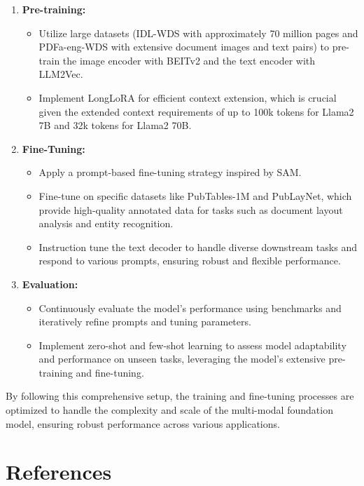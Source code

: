 \documentclass{article}
\begin{document}
\begin{enumerate}
    \item \textbf{Pre-training:}
    \begin{itemize}
        \item Utilize large datasets (IDL-WDS with approximately 70 million pages and PDFa-eng-WDS with extensive document images and text pairs) to pre-train the image encoder with BEITv2 and the text encoder with LLM2Vec.
        \item Implement LongLoRA for efficient context extension, which is crucial given the extended context requirements of up to 100k tokens for Llama2 7B and 32k tokens for Llama2 70B.
    \end{itemize}
    \item \textbf{Fine-Tuning:}
    \begin{itemize}
        \item Apply a prompt-based fine-tuning strategy inspired by SAM.
        \item Fine-tune on specific datasets like PubTables-1M and PubLayNet, which provide high-quality annotated data for tasks such as document layout analysis and entity recognition.
        \item Instruction tune the text decoder to handle diverse downstream tasks and respond to various prompts, ensuring robust and flexible performance.
    \end{itemize}
    \item \textbf{Evaluation:}
    \begin{itemize}
        \item Continuously evaluate the model's performance using benchmarks and iteratively refine prompts and tuning parameters.
        \item Implement zero-shot and few-shot learning to assess model adaptability and performance on unseen tasks, leveraging the model's extensive pre-training and fine-tuning.
    \end{itemize}
\end{enumerate}

By following this comprehensive setup, the training and fine-tuning processes are optimized to handle the complexity and scale of the multi-modal foundation model, ensuring robust performance across various applications.

\section{References}
\end{document}
